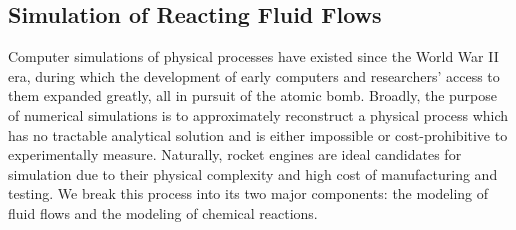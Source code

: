 \subsection{Simulation of Reacting Fluid Flows}

Computer simulations of physical processes have existed since the World War II era, during which the development of early computers and researchers' access to them expanded greatly, all in pursuit of the atomic bomb. Broadly, the purpose of numerical simulations is to approximately reconstruct a physical process which has no tractable analytical solution and is either impossible or cost-prohibitive to experimentally measure. Naturally, rocket engines are ideal candidates for simulation due to their physical complexity and high cost of manufacturing and testing. We break this process into its two major components: the modeling of fluid flows and the modeling of chemical reactions.

